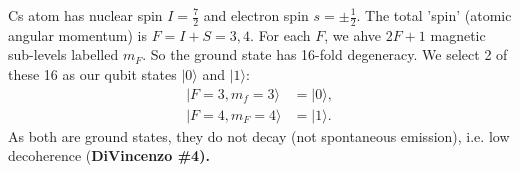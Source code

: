 \documentclass[lasers.tex]{subfiles}
\begin{document}
Cs atom has nuclear spin $I=\frac72$ and electron spin $s=\pm\frac12$.
The total 'spin' (atomic angular momentum) is $F=I+S=3,4$.
For each $F$, we ahve $2F+1$ magnetic sub-levels labelled $m_F$.
So the ground state has 16-fold degeneracy. 
We select 2 of these 16 as our qubit states $|0\rangle$ and $|1\rangle$:
\begin{align*}
    |F=3,m_f=3\rangle &= |0\rangle, \\
    |F=4,m_F=4\rangle &= |1\rangle. 
\end{align*}
As both are ground states, they do not decay (not spontaneous emission), i.e. low decoherence (\textbf{DiVincenzo \#4).}


\chapter{}
\end{document}
